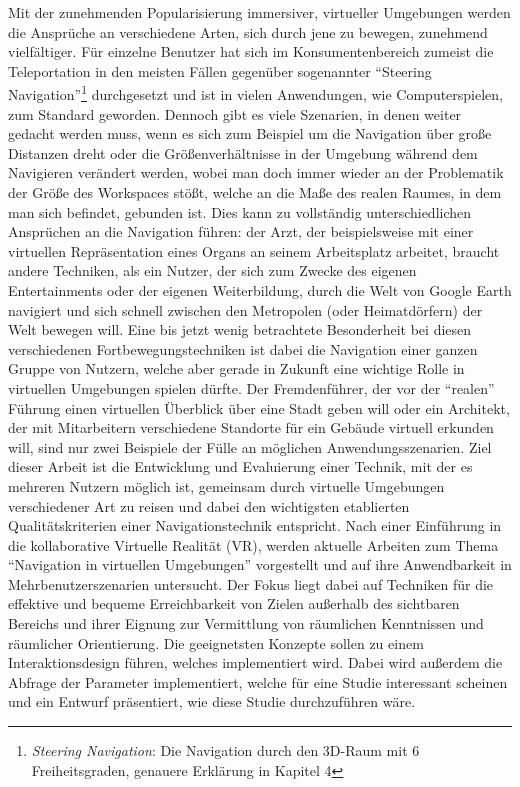 Mit der zunehmenden Popularisierung immersiver, virtueller Umgebungen werden die Ansprüche an verschiedene Arten, sich durch jene zu bewegen, zunehmend vielfältiger.
Für einzelne Benutzer hat sich im Konsumentenbereich zumeist die Teleportation in den meisten Fällen gegenüber sogenannter “Steering Navigation”\footnote{\textit{Steering Navigation}: Die Navigation durch den 3D-Raum mit 6 Freiheitsgraden, genauere Erklärung in Kapitel 4} durchgesetzt und ist in vielen Anwendungen, wie Computerspielen, zum Standard geworden. 
Dennoch gibt es viele Szenarien, in denen weiter gedacht werden muss, wenn es sich zum Beispiel um die Navigation über große Distanzen dreht oder die Größenverhältnisse in der Umgebung während dem Navigieren verändert werden, wobei man doch immer wieder an der Problematik der Größe des Workspaces stößt, welche an die Maße des realen Raumes, in dem man sich befindet, gebunden ist.
Dies kann zu vollständig unterschiedlichen Ansprüchen an die Navigation führen: der Arzt, der  beispielsweise mit einer virtuellen Repräsentation eines Organs an seinem Arbeitsplatz arbeitet, braucht andere Techniken, als ein Nutzer, der sich zum Zwecke des eigenen Entertainments oder der eigenen Weiterbildung, durch die Welt von Google Earth navigiert und sich schnell zwischen den Metropolen (oder Heimatdörfern) der Welt bewegen will. Eine bis jetzt wenig betrachtete Besonderheit bei diesen verschiedenen Fortbewegungstechniken ist dabei die Navigation einer ganzen Gruppe von Nutzern, welche aber gerade in Zukunft eine wichtige Rolle in virtuellen Umgebungen spielen dürfte. Der Fremdenführer, der vor der “realen” Führung einen virtuellen Überblick über eine Stadt geben will oder ein Architekt, der mit Mitarbeitern verschiedene Standorte für ein Gebäude virtuell erkunden will, sind nur zwei Beispiele der Fülle an möglichen Anwendungsszenarien.
Ziel dieser Arbeit ist die Entwicklung und Evaluierung einer Technik, mit der es mehreren Nutzern möglich ist, gemeinsam durch virtuelle Umgebungen verschiedener Art zu reisen und dabei den wichtigsten etablierten Qualitätskriterien einer Navigationstechnik entspricht. Nach einer Einführung in die kollaborative Virtuelle Realität (VR), werden aktuelle Arbeiten zum Thema “Navigation in virtuellen Umgebungen” vorgestellt und auf ihre Anwendbarkeit in Mehrbenutzerszenarien untersucht.
Der Fokus liegt dabei auf Techniken für die effektive und bequeme Erreichbarkeit von Zielen außerhalb des sichtbaren Bereichs und ihrer Eignung zur Vermittlung von räumlichen Kenntnissen und räumlicher Orientierung. 
Die geeignetsten Konzepte sollen zu einem Interaktionsdesign führen, welches implementiert wird. Dabei wird außerdem die Abfrage der Parameter implementiert, welche für eine Studie interessant scheinen und ein Entwurf präsentiert, wie diese Studie durchzuführen wäre.

